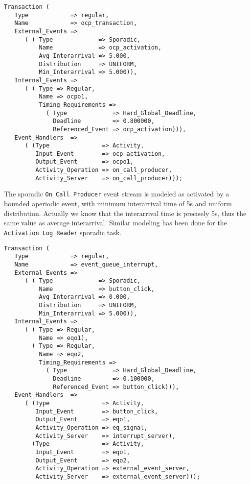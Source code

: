 \documentclass{article}
\begin{document}
\begin{lstlisting}
Transaction (
   Type            => regular,
   Name            => ocp_transaction,
   External_Events =>
      ( ( Type             => Sporadic,
          Name             => ocp_activation,
          Avg_Interarrival => 5.000,
          Distribution     => UNIFORM,
          Min_Interarrival => 5.000)),
   Internal_Events =>
      ( ( Type => Regular,
          Name => ocpo1,
          Timing_Requirements =>
            ( Type             => Hard_Global_Deadline,
              Deadline         => 0.800000,
              Referenced_Event => ocp_activation))),
   Event_Handlers  =>
      ( (Type               => Activity,
         Input_Event        => ocp_activation,
         Output_Event       => ocpo1,
         Activity_Operation => on_call_producer,
         Activity_Server    => on_call_producer)));
\end{lstlisting}

The sporadic \texttt{On Call Producer} event stream is modeled as activated by a bounded aperiodic event, with minimum interarrival time of 5s and uniform distribution. Actually we know that the interarrival time is precisely 5s, thus the same value as average interarrival. Similar modeling has been done for the \texttt{Activation Log Reader} sporadic task.

\begin{lstlisting}
Transaction (
   Type            => regular,
   Name            => event_queue_interrupt,
   External_Events =>
      ( ( Type             => Sporadic,
          Name             => button_click,
          Avg_Interarrival => 0.000,
          Distribution     => UNIFORM,
          Min_Interarrival => 5.000)),
   Internal_Events =>
      ( ( Type => Regular,
          Name => eqo1),
        ( Type => Regular,
          Name => eqo2,
          Timing_Requirements =>
            ( Type             => Hard_Global_Deadline,
              Deadline         => 0.100000,
              Referenced_Event => button_click))),
   Event_Handlers  =>
      ( (Type               => Activity,
         Input_Event        => button_click,
         Output_Event       => eqo1,
         Activity_Operation => eq_signal,
         Activity_Server    => interrupt_server),
        (Type               => Activity,
         Input_Event        => eqo1,
         Output_Event       => eqo2,
         Activity_Operation => external_event_server,
         Activity_Server    => external_event_server)));
\end{lstlisting}
\end{document}
